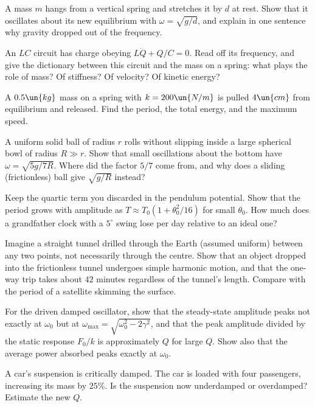\begin{problems}
\core A mass $m$ hangs from a vertical spring and stretches it by $d$ at rest. Show that it oscillates about its new equilibrium with $\omega=\sqrt{g/d}$, and explain in one sentence why gravity dropped out of the frequency.

\aside An $LC$ circuit has charge obeying $L\ddot{Q}+Q/C=0$. Read off its frequency, and give the dictionary between this circuit and the mass on a spring: what plays the role of mass? Of stiffness? Of velocity? Of kinetic energy?

 A $0.5\un{kg}$ mass on a spring with $k=200\un{N/m}$ is pulled $4\un{cm}$ from equilibrium and released. Find the period, the total energy, and the maximum speed.

 A uniform solid ball of radius $r$ rolls without slipping inside a large spherical bowl of radius $R \gg r$. Show that small oscillations about the bottom have $\omega = \sqrt{5g/7R}$. Where did the factor $5/7$ come from, and why does a sliding (frictionless) ball give $\sqrt{g/R}$ instead?

\core \label{prob:pendulum-anharmonic} Keep the quartic term you discarded in the pendulum potential. Show that the period grows with amplitude as $T\approx T_{0}\left(1+\theta_{0}^{2}/16\right)$ for small $\theta_{0}$. How much does a grandfather clock with a $5^\circ$ swing lose per day relative to an ideal one?

\label{prob:tunnel} Imagine a straight tunnel drilled through the Earth (assumed uniform) between any two points, not necessarily through the centre. Show that an object dropped into the frictionless tunnel undergoes simple harmonic motion, and that the one-way trip takes about $42$ minutes regardless of the tunnel's length. Compare with the period of a satellite skimming the surface.

\core For the driven damped oscillator, show that the steady-state amplitude peaks not exactly at $\omega_0$ but at $\omega_{\max} = \sqrt{\omega_0^2 - 2\gamma^2}$, and that the peak amplitude divided by the static response $F_0/k$ is approximately $Q$ for large $Q$. Show also that the average power absorbed peaks exactly at $\omega_0$.

\aside A car's suspension is critically damped. The car is loaded with four passengers, increasing its mass by $25\%$. Is the suspension now underdamped or overdamped? Estimate the new $Q$.


\end{problems}
